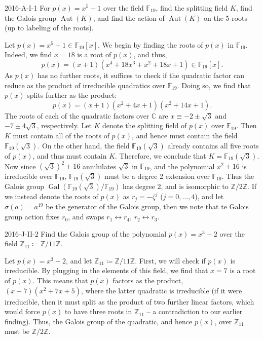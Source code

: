 \documentclass{article}
\begin{document}
	\begin{prb}{2016-A-I-1}
		For $p(x) = x^{5} + 1$ over the field $\mathbb{F}_{19}$, find the splitting field $K$, find the Galois group $\operatorname{Aut}(K)$, and find the action of $\operatorname{Aut}(K)$ on the 5 roots (up to labeling of the roots). 
	\end{prb}
	Let $p(x) = x^{5} + 1 \in \mathbb{F}_{19}[x]$. We begin by finding the roots of $p(x)$ in $\mathbb{F}_{19}$. Indeed, we find $x = 18$ is a root of $p(x)$, and thus, 
	\begin{equation*}
		p(x) = (x + 1)(x^{4} + 18x^{3} + x^{2} + 18x + 1) \in \mathbb{F}_{19}[x]. 
	\end{equation*}
	As $p(x)$ has no further roots, it suffices to check if the quadratic factor can reduce as the product of irreducible quadratics over $\mathbb{F}_{19}$. Doing so, we find that $p(x)$ splits further as the product: 
	\begin{equation*}
		p(x) = (x + 1)(x^{2} + 4x + 1)(x^{2} + 14x + 1). 
	\end{equation*}
	The roots of each of the quadratic factors over $\mathbb{C}$ are $x \equiv -2 \pm \sqrt{3}$ and $-7 \pm 4\sqrt{3}$, respectively. Let $K$ denote the splitting field of $p(x)$ over $\mathbb{F}_{19}$. Then $K$ must contain all of the roots of $p(x)$, and hence must contain the field $\mathbb{F}_{19}(\sqrt{3})$. On the other hand, the field $\mathbb{F}_{19}(\sqrt{3})$ already contains all five roots of $p(x)$, and thus must contain $K$. Therefore, we conclude that $K = \mathbb{F}_{19}(\sqrt{3})$. Now since $(\sqrt{3})^2 + 16$ annihilates $\sqrt{3}$ in $\mathbb{F}_{19}$, and the polynomial $x^2 + 16$ is irreducible over $\mathbb{F}_{19}$, $\mathbb{F}_{19}(\sqrt{3})$ must be a degree 2 extension over $\mathbb{F}_{19}$. Thus the Galois group $\operatorname{Gal}(\mathbb{F}_{19}(\sqrt{3})/\mathbb{F}_{19})$ has degree 2, and is isomorphic to $\mathbb{Z}/2\mathbb{Z}$. If we instead denote the roots of $p(x)$ as $r_{j} = -\zeta^{j}$ ($j = 0, \ldots, 4$), and let $\sigma(a) = a^{19}$ be the generator of the Galois group, then we note that te Galois group action fixes $r_{0}$, and swaps $r_{1} \leftrightarrow r_{4}$, $r_{2} \leftrightarrow r_{3}$. 
	
	\begin{prb}{2016-J-II-2}
		Find the Galois group of the polynomial $p(x) = x^{3} - 2$ over the field $\mathbb{Z}_{11} \coloneqq \mathbb{Z}/11\mathbb{Z}$. 
	\end{prb}
	Let $p(x) = x^{3} - 2$, and let $\mathbb{Z}_{11} \coloneqq \mathbb{Z}/11\mathbb{Z}$. First, we will check if $p(x)$ is irreducible. By plugging in the elements of this field, we find that $x = 7$ is a root of $p(x)$. This means that $p(x)$ factors as the product, $(x -7)(x^{2} + 7x + 5)$, where the latter quadratic is irreducible (if it were irreducible, then it must split as the product of two further linear factors, which would force $p(x)$ to have three roots in $\mathbb{Z}_{11}$ -- a contradiction to our earlier finding). Thus, the Galois group of the quadratic, and hence $p(x)$, over $\mathbb{Z}_{11}$ must be $\mathbb{Z}/2\mathbb{Z}$. 
	
\end{document}

